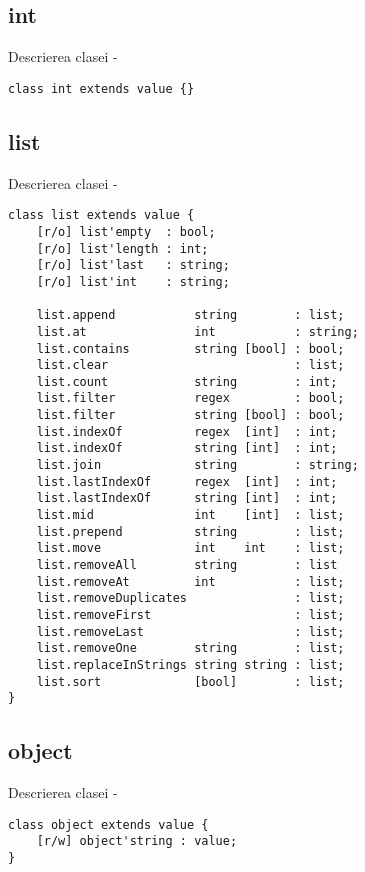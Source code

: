 \subsection{{\color{lightblue} int}}

\noindent Descrierea clasei \integer -
\begin{verbatim}
class int extends value {}
\end{verbatim}

\subsection{{\color{lightblue} list}}

\noindent Descrierea clasei \listtype -
\begin{verbatim}
class list extends value {
    [r/o] list'empty  : bool;
    [r/o] list'length : int;
    [r/o] list'last   : string;
    [r/o] list'int    : string;

    list.append           string        : list;
    list.at               int           : string;
    list.contains         string [bool] : bool;
    list.clear                          : list;
    list.count            string        : int;
    list.filter           regex         : bool;
    list.filter           string [bool] : bool;
    list.indexOf          regex  [int]  : int;
    list.indexOf          string [int]  : int;
    list.join             string        : string;
    list.lastIndexOf      regex  [int]  : int;
    list.lastIndexOf      string [int]  : int;
    list.mid              int    [int]  : list;
    list.prepend          string        : list;
    list.move             int    int    : list;
    list.removeAll        string        : list
    list.removeAt         int           : list;
    list.removeDuplicates               : list;
    list.removeFirst                    : list;
    list.removeLast                     : list;
    list.removeOne        string        : list;
    list.replaceInStrings string string : list;
    list.sort             [bool]        : list;
}
\end{verbatim}

\subsection{{\color{lightblue} object}}

\noindent Descrierea clasei \object -
\begin{verbatim}
class object extends value {
    [r/w] object'string : value;
}
\end{verbatim}


